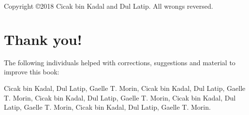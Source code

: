 

\thispagestyle{empty}
\beforepartskip

\newlength{\centeroffset}
\setlength{\centeroffset}{-0.5\oddsidemargin}
\addtolength{\centeroffset}{0.5\evensidemargin}
\thispagestyle{empty}
\noindent\hspace*{\centeroffset}\makebox[0pt][l]{\begin{minipage}{\textwidth}
\flushright
{\Huge\bfseries \maintitle}
\noindent\rule[-1ex]{\textwidth}{5pt}\\[2.5ex]
\hfill\emph{\Large \subtitle}
\end{minipage}}

\noindent\hspace*{\centeroffset}


\pagebreak
\let\cleardoublepage\clearpage

\sloppy
\frontmatter
\begin{small} 
  \noindent Copyright \copyright 2018 Cicak bin Kadal and Dul Latip.  All wrongs reversed.

  \lipsum[1]
\end{small}

\chapter{Thank you!}
\noindent%
\lipsum[1]

\newpage \noindent%
The following individuals helped with corrections, suggestions and
material to improve this book:

{\flushleft\small
Cicak bin Kadal,
Dul Latip,
Gaelle T. Morin,
Cicak bin Kadal,
Dul Latip,
Gaelle T. Morin,
Cicak bin Kadal,
Dul Latip,
Gaelle T. Morin,
Cicak bin Kadal,
Dul Latip,
Gaelle T. Morin,
Cicak bin Kadal,
Dul Latip,
Gaelle T. Morin.
}

